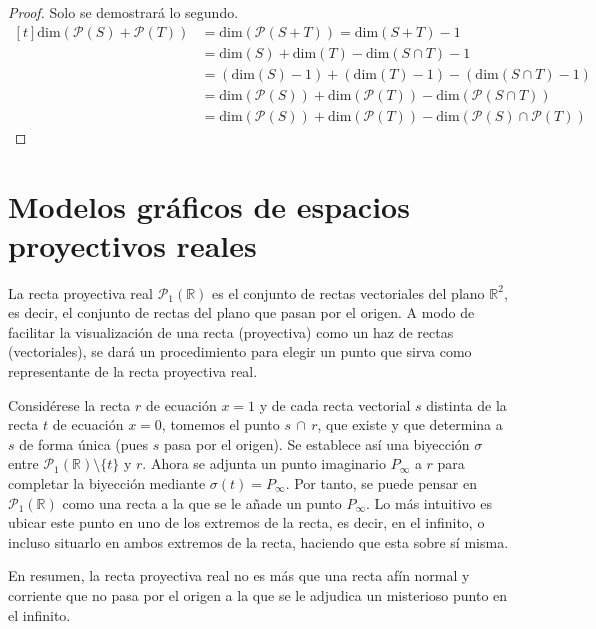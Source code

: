 \documentclass[12pt]{report}
\theoremstyle{definition}
\theoremstyle{definition}
\theoremstyle{remark}
\newcommand{\R}{\mathbb R}
\begin{document}
\begin{proof}
Solo se demostrará lo segundo.
\[\begin{aligned}[t]
\mathrm{dim}(\mathcal{P}(S)+\mathcal{P}(T)) &= \mathrm{dim}(\mathcal{P}(S+T))=\mathrm{dim}(S+T)-1 \\
&= \mathrm{dim}(S)+\mathrm{dim}(T)-\mathrm{dim}(S \cap T)-1 \\
&= (\mathrm{dim}(S)-1)+(\mathrm{dim}(T)-1)-(\mathrm{dim}(S \cap T)-1) \\
&= \mathrm{dim}(\mathcal{P}(S))+\mathrm{dim}(\mathcal{P}(T))-\mathrm{dim}(\mathcal{P}(S \cap T))\\
&= \mathrm{dim}(\mathcal{P}(S))+\mathrm{dim}(\mathcal{P}(T))-\mathrm{dim}(\mathcal{P}(S) \cap \mathcal{P}(T))
\end{aligned}
\]
\end{proof}

\section{Modelos gráficos de espacios proyectivos reales}

La recta proyectiva real $\mathcal{P}_1(\R)$ es el conjunto de rectas vectoriales del plano $\R^2$, es decir, el conjunto de rectas del plano que pasan por el origen. A modo de facilitar la visualización de una recta (proyectiva) como un haz de rectas (vectoriales), se dará un procedimiento para elegir un punto que sirva como representante de la recta proyectiva real.

\vspace{2mm}
Considérese la recta $r$ de  ecuación $x = 1$ y de cada recta vectorial $s$ distinta de la recta $t$ de ecuación $x = 0$, tomemos el punto $s \, \cap \, r$, que existe y que determina a $s$ de forma única (pues $s$ pasa por el origen). Se establece así una biyección $\sigma$ entre $\mathcal{P}_1(\R) \setminus \{t\}$ y $r$. Ahora se adjunta un punto imaginario $P_\infty$ a $r$ para completar la biyección mediante $\sigma(t) = P_\infty$. Por tanto, se puede pensar en $\mathcal{P}_1(\R)$ como una recta a la que se le añade un punto $P_\infty$. Lo más intuitivo es ubicar este punto en uno de los extremos de la recta, es decir, en el infinito, o incluso situarlo en ambos extremos de la recta, haciendo que esta  sobre sí misma.

\vspace{2mm}
En resumen, la recta proyectiva real no es más que una recta afín normal y corriente que no pasa por el origen a la que se le adjudica un misterioso punto en el infinito.
\end{document}
